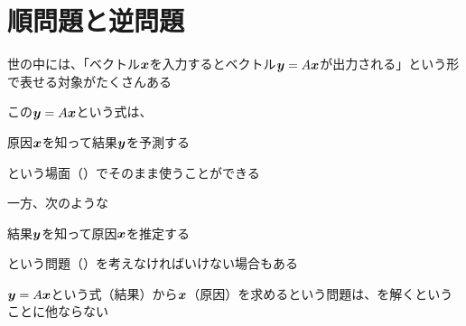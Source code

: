 \documentclass[../../../topic_linear-algebra]{subfiles}
\begin{document}
\sectionline
\section{順問題と逆問題}

世の中には、「ベクトル$\vb*{x}$を入力するとベクトル$\vb*{y} = A\vb*{x}$が出力される」という形で表せる対象がたくさんある

\br

この$\vb*{y} = A\vb*{x}$という式は、
\begin{shaded}
  原因$\vb*{x}$を知って結果$\vb*{y}$を予測する
\end{shaded}
という場面（）でそのまま使うことができる

\br

一方、次のような
\begin{shaded}
  結果$\vb*{y}$を知って原因$\vb*{x}$を推定する
\end{shaded}
という問題（）を考えなければいけない場合もある

\br

$\vb*{y} = A\vb*{x}$という式（結果）から$\vb*{x}$（原因）を求めるという問題は、を解くということに他ならない
\end{document}
